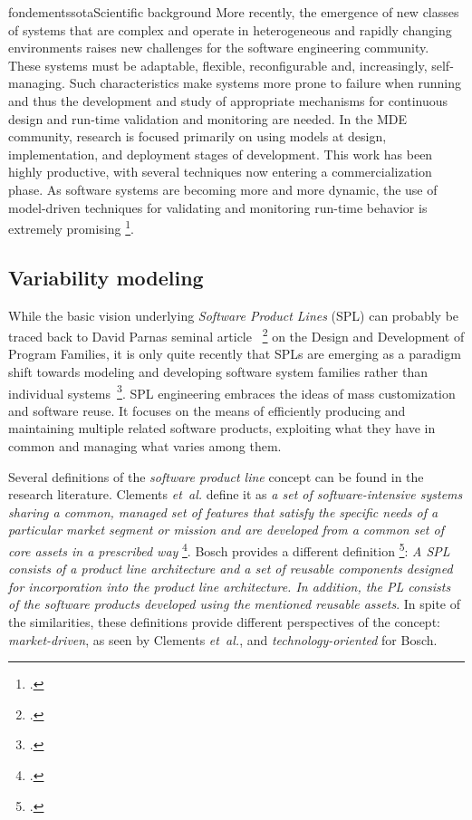 \documentclass{ra2018}
\begin{document}
\begin{module}{fondements}{sota}{Scientific background}
More recently, the emergence of new classes of systems that are complex and  operate in heterogeneous and rapidly changing environments raises new challenges for the software engineering community. These systems must be adaptable, flexible, reconfigurable and, increasingly, self-managing. Such characteristics make systems more prone to failure when running and thus the development and study of appropriate mechanisms for continuous design and run-time validation and monitoring are needed. In the MDE community, research is focused primarily on using models at design, implementation, and deployment stages of development. This work has been highly productive, with several techniques now entering a commercialization phase. As software systems are becoming more and more dynamic, the use of model-driven techniques for validating and monitoring run-time behavior
is extremely promising   \footcite{Morin09f}.



\subsection{Variability modeling}
\label{sec:variability}
While the basic vision underlying \textit{Software Product Lines} (SPL) can
probably be traced back to David Parnas seminal article~  \footcite{parnas1976} on
the Design and Development of Program Families, it is only quite recently that
SPLs are emerging as a paradigm shift towards modeling and developing
software system families rather than individual
systems~\footcite{Northrop1999}. SPL engineering embraces the ideas of mass
customization and software reuse. It focuses on the means of efficiently
producing and maintaining multiple related software products, exploiting what
they have in common and managing what varies among them.

Several definitions of the \emph{software product line} concept can be found
in the research literature. Clements \textit{et~al.} define it as \textit{a set of
software-intensive systems sharing a common, managed set of features that
satisfy the specific needs of a particular market segment or mission and are
developed from a common set of core assets in a prescribed way}
  \footcite{Northrop2002}. Bosch provides a different definition   \footcite{Bosch2000}:
\textit{A SPL consists of a product line architecture and a set of reusable
components designed for incorporation into the product line architecture. In
addition, the PL consists of the software products developed using the
mentioned reusable assets}. In spite of the similarities, these definitions
provide different perspectives of the concept: \textit{market-driven}, as seen
by Clements \textit{et~al.}, and \textit{technology-oriented} for Bosch.


\end{module}
\end{document}
